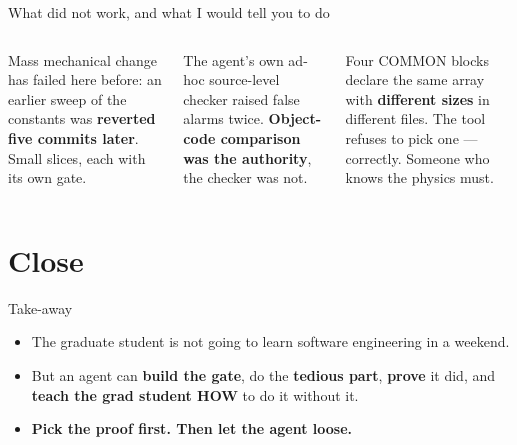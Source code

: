 \documentclass[aspectratio=169]{beamer}
\begin{document}
\begin{frame}{What did not work, and what I would tell you to do}
  \begin{columns}[T,onlytextwidth]
      \begin{cookiecard}[title=1. Go small]
        \footnotesize
        Mass mechanical change has failed here before: an earlier sweep of the constants was \textbf{reverted five commits later}. Small slices, each with its own gate.
      \end{cookiecard}
      \begin{cookiecard}[title=2. Distrust checkers]
        \footnotesize
        The agent's own ad-hoc source-level checker raised false alarms twice. \textbf{Object-code comparison was the authority}, the checker was not.
      \end{cookiecard}
      \begin{cookiecard}[title=3. Some calls are human]
        \footnotesize
        Four COMMON blocks declare the same array with \textbf{different sizes} in different files. The tool refuses to pick one --- correctly. Someone who knows the physics must.
      \end{cookiecard}
  \end{columns}
\end{frame}

\section{Close}

\begin{frame}{Take-away}
  \begin{itemize}\setlength\itemsep{8pt}
    \item The graduate student is not going to learn software engineering in a weekend.
    \item But an agent can \textbf{build the gate}, do the \textbf{tedious part}, \textbf{prove} it did, and \textbf{teach the grad student HOW} to do it without it.
    \item \textbf{Pick the proof first. Then let the agent loose.}
  \end{itemize}
\end{frame}
\end{document}

